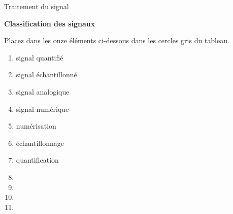 \documentclass[11pt, twoside, a4paper]{article}
\begin{document}
   \hfill Traitement du signal \hfill {}
  \begin{center}
    \LARGE\textbf{Classification des signaux}
  \end{center}
\bigskip\bigskip


Placez dans les onze éléments ci-dessous dans les cercles gris du tableau.

\bigskip

\begin{multicols}{3}
\begin{enumerate}[label= \raisebox{.5pt}{\Large\textcircled{\raisebox{-.5pt}{\normalsize\arabic*}} } ]
  \item signal quantifié
  \item signal échantillonné
  \item signal analogique
  \item signal numérique
  \item numérisation
  \item échantillonnage
  \item quantification
  \item {}
  \item {}
  \item {}
  \item {}
\end{enumerate}
\end{multicols}

\bigskip\bigskip
\end{document}
